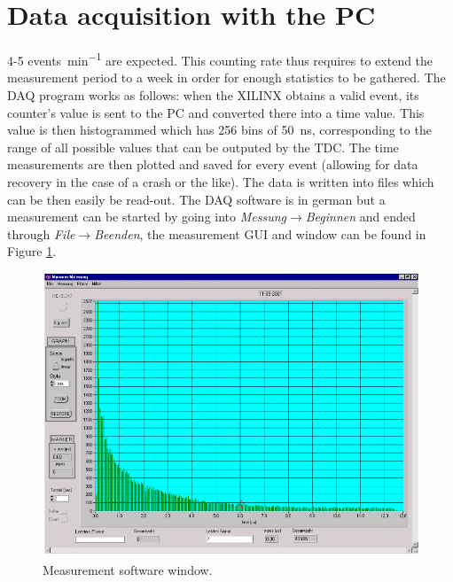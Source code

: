 \section{Data acquisition with the PC}

4-5 \si{events\per\minute} are expected. This counting rate thus requires to extend the measurement period to a week in order for enough statistics to be gathered. The DAQ program works as follows: when the XILINX obtains a valid event, its counter's value is sent to the PC and converted there into a time value. This value is then histogrammed which has 256 bins of \SI{50}{\nano\second}, corresponding to the range of all possible values that can be outputed by the TDC. The time measurements are then plotted and saved for every event (allowing for data recovery in the case of a crash or the like). The data is written into files which can be then easily be read-out. The DAQ software is in german but a measurement can be started by going into \textit{Messung}$\rightarrow$\textit{Beginnen} and ended through \textit{File}$\rightarrow$\textit{Beenden}, the measurement GUI and window can be found in Figure \ref{fig:MP}.

\begin{figure}
\centering
\includegraphics[width=\linewidth]{./fig/MP.png}
\caption{Measurement software window.}
\label{fig:MP}
\end{figure}
